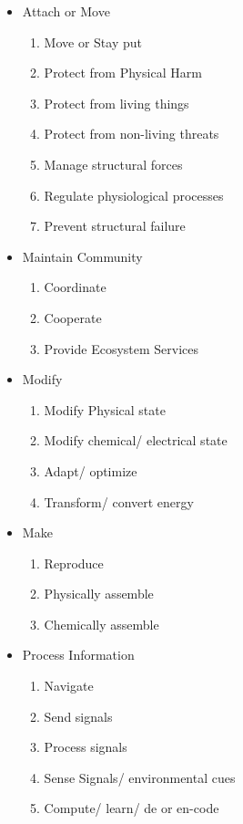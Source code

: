 \begin{itemize}

\item Attach or Move
  \begin {enumerate}
    \item Move or Stay put
    \item Protect from Physical Harm
    \item Protect from living things
    \item Protect from non-living threats
    \item Manage structural forces
    \item Regulate physiological processes
    \item Prevent structural failure
  \end {enumerate}

\item Maintain Community
  \begin {enumerate}
    \item Coordinate
    \item Cooperate
    \item Provide Ecosystem Services
  \end {enumerate}

\item Modify
  \begin {enumerate}
    \item Modify Physical state
    \item Modify chemical/ electrical state
    \item Adapt/ optimize
    \item Transform/ convert energy
  \end{enumerate}

\item Make
  \begin {enumerate}
    \item Reproduce
    \item Physically assemble
    \item Chemically assemble
  \end{enumerate}

\item Process Information
  \begin{enumerate}
    \item Navigate
    \item Send signals
    \item Process signals
    \item Sense Signals/ environmental cues
    \item Compute/ learn/ de or en-code
  \end{enumerate}


\end{itemize}
